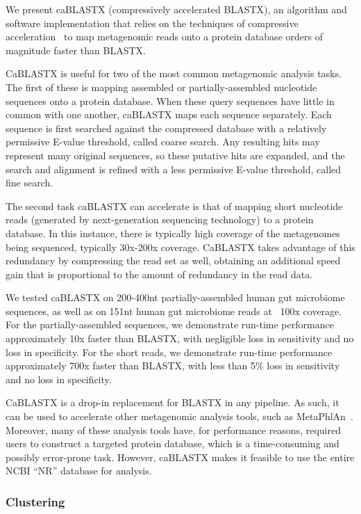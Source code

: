 \documentclass[review,preprint,12pt]{elsarticle}
\renewcommand{\cite}{\citep} %
\theoremstyle{definition}
\theoremstyle{remark}
\numberwithin{equation}{section}
\begin{document}
We present caBLASTX (compressively accelerated BLASTX), an algorithm and 
software implementation that relies on the techniques of compressive 
acceleration~\cite{loh2012compressive, daniels2013compressive} to map 
metagenomic reads onto a protein database orders of magnitude faster than 
BLASTX.

CaBLASTX is useful for two of the most common metagenomic analysis tasks. 
The first of these is mapping assembled or partially-assembled
nucleotide sequences onto a protein database. 
When these query sequences have
little in common with one another, caBLASTX maps each sequence separately. 
Each sequence is first searched against the compressed database with a 
relatively permissive E-value threshold, called coarse search. 
Any resulting hits may represent many original sequences, so these putative 
hits are expanded, and the search and alignment is refined with a less 
permissive E-value threshold, called fine search.

The second task caBLASTX can accelerate is that of mapping short nucleotide
reads (generated by next-generation sequencing technology) to a protein
database. In this instance, there is typically high coverage of the metagenomes
being sequenced, typically 30x-200x coverage. CaBLASTX takes advantage of this
redundancy
by compressing the read set as well, obtaining an additional speed gain that is
proportional to the amount of redundancy in the read data.


We tested caBLASTX on 200-400nt partially-assembled human gut microbiome
sequences, as well as on 151nt human gut microbiome reads at ~100x coverage.
For the partially-assembled sequences, we demonstrate run-time performance
approximately 10x faster than BLASTX, with negligible loss in sensitivity and
no loss in specificity. For the short reads, we demonstrate run-time
performance approximately 700x faster than BLASTX, with less than 5\% loss in
sensitivity and no loss in specificity.

CaBLASTX is a drop-in replacement for BLASTX in any pipeline.
As such, it can be used to accelerate other metagenomic analysis tools, such
as MetaPhlAn~\cite{segata2012metagenomic}.
Moreover, many of these analysis tools have, for performance reasons, required
users to construct a targeted protein database, which is a time-consuming and
possibly error-prone task.
However, caBLASTX makes it feasible to use the entire NCBI ``NR'' database for
analysis.

\subsubsection{Clustering}
\end{document}
